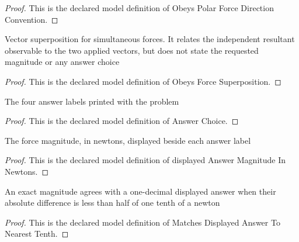 \begin{proof}
  This is the declared model definition of Obeys Polar Force Direction Convention.
\end{proof}
\begin{definition}
  \label{def:physics:phyx-mini-0677:phyxminiproblems-problemphyxmini0677-obeysforcesuperposition}
  Vector superposition for simultaneous forces. It relates the independent resultant observable to the two applied vectors, but does not state the requested magnitude or any answer choice
\end{definition}
\begin{proof}
  This is the declared model definition of Obeys Force Superposition.
\end{proof}
\begin{definition}
  \label{def:physics:phyx-mini-0677:phyxminiproblems-problemphyxmini0677-answerchoice}
  The four answer labels printed with the problem
\end{definition}
\begin{proof}
  This is the declared model definition of Answer Choice.
\end{proof}
\begin{definition}
  \label{def:physics:phyx-mini-0677:phyxminiproblems-problemphyxmini0677-displayedanswermagnitudeinnewtons}
  The force magnitude, in newtons, displayed beside each answer label
\end{definition}
\begin{proof}
  This is the declared model definition of displayed Answer Magnitude In Newtons.
\end{proof}
\begin{definition}
  \label{def:physics:phyx-mini-0677:phyxminiproblems-problemphyxmini0677-matchesdisplayedanswertonearesttenth}
  An exact magnitude agrees with a one-decimal displayed answer when their absolute difference is less than half of one tenth of a newton
\end{definition}
\begin{proof}
  This is the declared model definition of Matches Displayed Answer To Nearest Tenth.
\end{proof}
